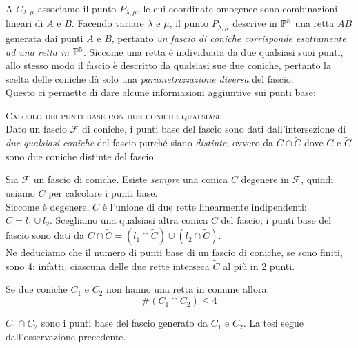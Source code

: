 A $C_{\lambda,\mu}$ associamo il punto $P_{\lambda,\mu}$, le cui coordinate omogenee sono combinazioni lineari di $A$ e $B$. Facendo variare $\lambda$ e $\mu$, il punto $P_{\lambda,\mu}$ descrive in $\proj[5]{\ }$ una retta $\overline{AB}$ generata dai punti $A$ e $B$, pertanto \textit{un fascio di coniche corrisponde esattamente ad una retta in} $\proj[5]{\ }$. Siccome una retta è individuata da due qualsiasi suoi punti, allo stesso modo il fascio è descritto da qualsiasi sue due coniche, pertanto la scelta delle coniche dà solo una \textit{parametrizzazione diversa} del fascio.\\
Questo ci permette di dare alcune informazioni aggiuntive sui punti base:
\begin{tips} \textsc{Calcolo dei punti base con due coniche qualsiasi}.\\
	Dato un fascio $\mathcal{F}$ di coniche, i punti base del fascio sono dati dall'intersezione di \textit{due qualsiasi coniche} del fascio purché siano \textit{distinte}, ovvero da $C\cap\widetilde{C}$ dove $C$ e $\widetilde{C}$ sono due coniche distinte del fascio.
\end{tips}
\begin{observe}
	Sia $\mathcal{F}$ un fascio di coniche. Esiste \textit{sempre} una conica $C$ degenere in $\mathcal{F}$, quindi usiamo $C$ per calcolare i punti base.\\
	Siccome è degenere, $C$ è l'unione di due rette linearmente indipendenti: $C=l_1\cup l_2$. Scegliamo una qualsiasi altra conica $\widetilde{C}$ del fascio; i punti base del fascio sono dati da $C\cap\widetilde{C}=(l_1\cap\widetilde{C})\cup (l_2\cap \widetilde{C})$.\\
	Ne deduciamo che il numero di punti base di un fascio di coniche, se sono finiti, sono 4: infatti, ciascuna delle due rette interseca $\widetilde{C}$ al più in 2 punti.
\end{observe}

\begin{corollary}
	Se due coniche $C_1$ e $C_2$ non hanno una retta in comune allora:
	\begin{equation}
		\#(C_1\cap C_2)\leq 4
	\end{equation}
\vspace{-6mm}
\end{corollary}
\begin{demonstration}
	$C_1\cap C_2$ sono i punti base del fascio generato da $C_1$ e $C_2$. La tesi segue dall'osservazione precedente.
\end{demonstration}

